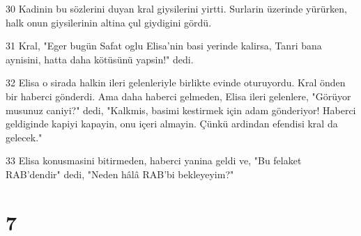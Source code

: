 \par 30 Kadinin bu sözlerini duyan kral giysilerini yirtti. Surlarin üzerinde yürürken, halk onun giysilerinin altina çul giydigini gördü.
\par 31 Kral, "Eger bugün Safat oglu Elisa'nin basi yerinde kalirsa, Tanri bana aynisini, hatta daha kötüsünü yapsin!" dedi.
\par 32 Elisa o sirada halkin ileri gelenleriyle birlikte evinde oturuyordu. Kral önden bir haberci gönderdi. Ama daha haberci gelmeden, Elisa ileri gelenlere, "Görüyor musunuz caniyi?" dedi, "Kalkmis, basimi kestirmek için adam gönderiyor! Haberci geldiginde kapiyi kapayin, onu içeri almayin. Çünkü ardindan efendisi kral da gelecek."
\par 33 Elisa konusmasini bitirmeden, haberci yanina geldi ve, "Bu felaket RAB'dendir" dedi, "Neden hâlâ RAB'bi bekleyeyim?"

\chapter{7}

